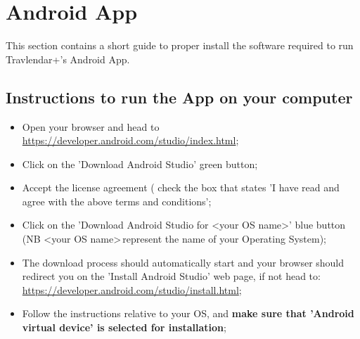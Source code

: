 \section{Android App}
\label{sect:Android App}
This section contains a short guide to proper install the software required to run Travlendar+'s Android App.

\subsection{Instructions to run the App on your computer}
\label{subsect:Computer Instructions}
\begin{itemize}
	\item Open your browser and head to \\ \href{https://developer.android.com/studio/index.html}{\color{blue}https://developer.android.com/studio/index.html};
	\item Click on the 'Download Android Studio' green button;
	\item Accept the license agreement ( check the box that states 'I have read and agree with the above terms and conditions';
	\item Click on the 'Download Android Studio for \textless your OS name\textgreater' blue button (NB \textless your OS name\textgreater  \,represent the name of your Operating System);
	\item The download process should automatically start and your browser should redirect you on the 'Install Android Studio' web page, if not head to: \href{https://developer.android.com/studio/install.html}{\color{blue}https://developer.android.com/studio/install.html};
	\item Follow the instructions relative to your OS, and \textbf{make sure that 'Android virtual device' is selected for installation};
\end{itemize}
